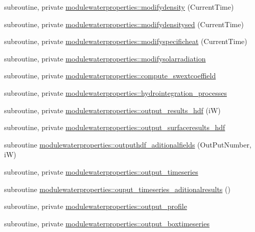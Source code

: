 \begin{DoxyCompactItemize}
\item 
subroutine, private \mbox{\hyperlink{namespacemodulewaterproperties_a7727e3b2ffd1b7f1c501dc60cf64c723}{modulewaterproperties\+::modifydensity}} (Current\+Time)
\item 
subroutine, private \mbox{\hyperlink{namespacemodulewaterproperties_a430bfd6acd72693785ebf7d3e3a9dea8}{modulewaterproperties\+::modifydensitysed}} (Current\+Time)
\item 
subroutine, private \mbox{\hyperlink{namespacemodulewaterproperties_ac377b27826c6ced4a835d6e47384f917}{modulewaterproperties\+::modifyspecificheat}} (Current\+Time)
\item 
subroutine, private \mbox{\hyperlink{namespacemodulewaterproperties_a53a84226a2a46ab704fec5883bc4639a}{modulewaterproperties\+::modifysolarradiation}}
\item 
subroutine, private \mbox{\hyperlink{namespacemodulewaterproperties_aa1d438c16bd8399614f3b5058f6a58e8}{modulewaterproperties\+::compute\+\_\+swextcoeffield}}
\item 
subroutine, private \mbox{\hyperlink{namespacemodulewaterproperties_a9766d3375543a27f75f30630ffe87795}{modulewaterproperties\+::hydrointegration\+\_\+processes}}
\item 
subroutine, private \mbox{\hyperlink{namespacemodulewaterproperties_aa0e5621dbf495abbff865260517a210e}{modulewaterproperties\+::output\+\_\+results\+\_\+hdf}} (iW)
\item 
subroutine, private \mbox{\hyperlink{namespacemodulewaterproperties_a3c8948249582551960c897355058c5f0}{modulewaterproperties\+::output\+\_\+surfaceresults\+\_\+hdf}}
\item 
subroutine \mbox{\hyperlink{namespacemodulewaterproperties_a0e590dc368b505cd9ea918d724d3eee3}{modulewaterproperties\+::outputhdf\+\_\+aditionalfields}} (Out\+Put\+Number, iW)
\item 
subroutine, private \mbox{\hyperlink{namespacemodulewaterproperties_a0725e3aa303d243b60469b2ad581deaa}{modulewaterproperties\+::output\+\_\+timeseries}}
\item 
subroutine \mbox{\hyperlink{namespacemodulewaterproperties_a98520e5c44c187e7d09c51cc9864bb63}{modulewaterproperties\+::ouput\+\_\+timeseries\+\_\+aditionalresults}} ()
\item 
subroutine, private \mbox{\hyperlink{namespacemodulewaterproperties_adbe4280f2ebe3767932360d61563ff93}{modulewaterproperties\+::output\+\_\+profile}}
\item 
subroutine, private \mbox{\hyperlink{namespacemodulewaterproperties_a8400d7aab12081d64e14b5947eb9734c}{modulewaterproperties\+::output\+\_\+boxtimeseries}}

\end{DoxyCompactItemize}
